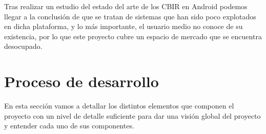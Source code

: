 Tras realizar un estudio del estado del arte de los CBIR en Android podemos llegar a la conclusión de que se tratan de sistemas que han sido poco explotados en dicha plataforma, y lo más importante, el usuario medio no conoce de su existencia, por lo que este proyecto cubre un espacio de mercado que se encuentra desocupado.\\

\section{Proceso de desarrollo}

En esta sección vamos a detallar los distintos elementos que componen el proyecto con un nivel de detalle suficiente para dar una visión global del proyecto y entender cada uno de sus componentes.\\








